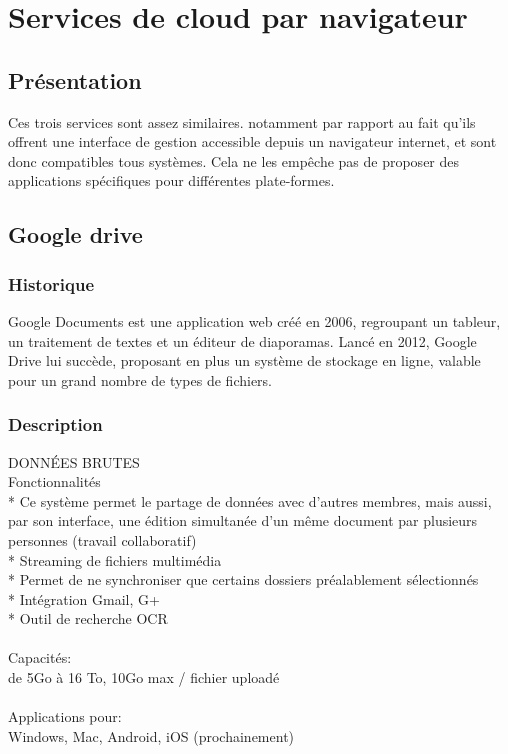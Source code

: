 \chapter{Services de cloud par navigateur}
\thispagestyle{EIP} %

\section{Présentation}
Ces trois services sont assez similaires. notamment par rapport au fait qu'ils offrent une interface de gestion accessible depuis un navigateur internet, et sont donc compatibles tous systèmes. Cela ne les empêche pas de proposer des applications spécifiques pour différentes plate-formes.

\section{Google drive}

\subsection{Historique}
Google Documents est une application web créé en 2006, regroupant un tableur, un traitement de textes et un éditeur de diaporamas.
Lancé en 2012, Google Drive lui succède, proposant en plus un système de stockage en ligne, valable pour un grand nombre de types de fichiers.\\

\subsection{Description}
DONNÉES BRUTES\\
Fonctionnalités\\
* Ce système permet le partage de données avec d'autres membres, mais aussi, par son interface, une édition simultanée d'un même document par plusieurs personnes (travail collaboratif)\\
* Streaming de fichiers multimédia\\
* Permet de ne synchroniser que certains dossiers préalablement sélectionnés\\
* Intégration Gmail, G+\\
* Outil de recherche OCR\\
\\
Capacités:\\
de 5Go à 16 To, 10Go max / fichier uploadé\\
\\
Applications pour:\\
Windows, Mac, Android, iOS (prochainement)\\



